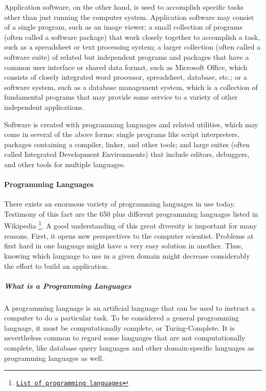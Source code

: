 Application software, on the other hand, is used to accomplish specific tasks other than just running the computer system. Application software may consist of a single program, such as an image viewer; a small collection of programs (often called a software package) that work closely together to accomplish a task, such as a spreadsheet or text processing system; a larger collection (often called a software suite) of related but independent programs and packages that have a common user interface or shared data format, such as Microsoft Office, which consists of closely integrated word processor, spreadsheet, database, etc.; or a software system, such as a database management system, which is a collection of fundamental programs that may provide some service to a variety of other independent applications.

Software is created with programming languages and related utilities, which may come in several of the above forms: single programs like script interpreters, packages containing a compiler, linker, and other tools; and large suites (often called Integrated Development Environments) that include editors, debuggers, and other tools for multiple languages. \cite{14}


\paragraph*{Programming Languages}
\hfill \break
There exists an enormous variety of programming languages in use today. Testimony of this fact are the 650 plus different programming languages listed in Wikipedia \footnote{\href{http://en.wikipedia.org/wiki/List_of_programming_languages}{\texttt{List of programming languages}}}. A good understanding of this great diversity is important for many reasons. First, it opens new perspectives to the computer scientist. Problems at first hard in one language might have a very easy solution in another. Thus, knowing which language to use in a given domain might decrease considerably the effort to build an application.


\subparagraph*{What is a Programming Languages}
\hfill \break
A programming language is an artificial language that can be used to instruct a computer to do a particular task. To be considered a general programming language, it must be computationally complete, or Turing-Complete. It is nevertheless common to regard some languages that are not computationally complete, like database query languages and other domain-specific languages as programming languages as well.\cite{14}

